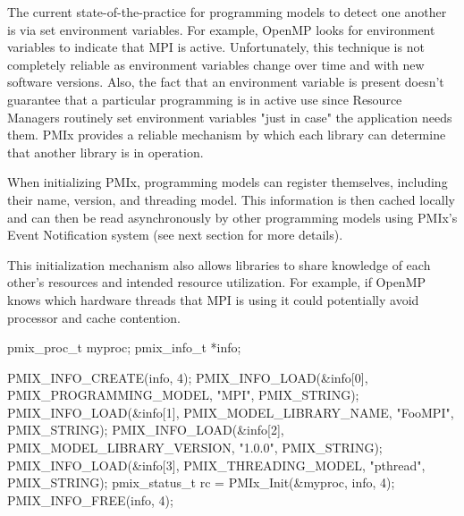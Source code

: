 The current state-of-the-practice for programming models to detect one another is via set environment variables.  For example, OpenMP looks for environment variables to indicate that MPI is active.  Unfortunately, this technique is not completely reliable as environment variables change over time and with new software versions.  Also, the fact that an environment variable is present doesn't guarantee that a particular programming is in active use since Resource Managers routinely set environment variables "just in case" the application needs them. PMIx provides a reliable mechanism by which each library can determine that another library is in operation.

When initializing PMIx, programming models can register themselves, including their name, version, and threading model.  This information is then cached locally and can then be read asynchronously by other programming models using PMIx's Event Notification system (see next section for more details).

This initialization mechanism also allows libraries to share knowledge of each other's resources and intended resource utilization. For example, if OpenMP knows which hardware threads that MPI is using it could potentially avoid processor and cache contention.

\relatedapis

{\large {}}


\example

\cspecificstart
\begin{codepar}
pmix_proc_t myproc;
pmix_info_t *info;

PMIX_INFO_CREATE(info, 4);
PMIX_INFO_LOAD(&info[0], PMIX_PROGRAMMING_MODEL,
               "MPI", PMIX_STRING);
PMIX_INFO_LOAD(&info[1], PMIX_MODEL_LIBRARY_NAME,
               "FooMPI", PMIX_STRING);
PMIX_INFO_LOAD(&info[2], PMIX_MODEL_LIBRARY_VERSION,
               "1.0.0", PMIX_STRING);
PMIX_INFO_LOAD(&info[3], PMIX_THREADING_MODEL,
               "pthread", PMIX_STRING);
pmix_status_t rc = PMIx_Init(&myproc, info, 4);
PMIX_INFO_FREE(info, 4);
\end{codepar}
\cspecificend


